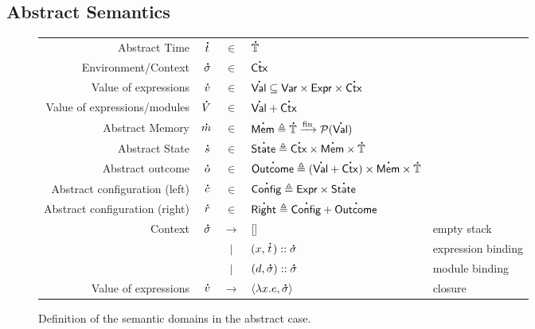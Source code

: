 \documentclass[acmsmall,screen,review]{acmart}\settopmatter{printfolios=true,printccs=false,printacmref=false}
\newcommand*{\vbar}{|}
\newcommand*{\cons}{::}
\newcommand*{\pset}{\mathcal{P}}
\newcommand*{\A}[1]{\overset{\,_{\mbox{\Large .}}}{#1}}
\newcommand*{\Expr}{\mathsf{Expr}}
\newcommand*{\ExprVar}{\mathsf{Var}}
\newcommand*{\modid}{d}
\newcommand*{\Time}{\mathbb{T}}
\newcommand*{\ctx}{\sigma}
\newcommand*{\Ctx}{\mathsf{Ctx}}
\newcommand*{\Value}{\mathsf{Val}}
\newcommand*{\Mem}{\mathsf{Mem}}
\newcommand*{\mem}{m}
\newcommand*{\Config}{\mathsf{Config}}
\newcommand*{\config}{c}
\newcommand*{\Right}{\mathsf{Right}}
\newcommand*{\rightst}{r}
\newcommand*{\State}{\mathsf{State}}
\newcommand*{\Outcome}{\mathsf{Outcome}}
\newcommand*{\fin}[2]{{#1}\xrightarrow{\text{fin}}{#2}}
\begin{document}
\subsection{Abstract Semantics}
\begin{figure}[h!]
  \footnotesize
  \centering
  \begin{tabular}{rrcll}
    Abstract Time                  & $\A{t}$        & $\in$         & $\A{\Time}$                                                                                      \\
    Environment/Context            & $\A{\ctx}$     & $\in$         & $\A{\Ctx}$                                                                                       \\
    Value of expressions           & $\A{v}$        & $\in$         & $\A{\Value} \subseteq \ExprVar\times\Expr\times\A{\Ctx}$                                         \\
    Value of expressions/modules   & $\A{V}$        & $\in$         & $\A{\Value}+\A{\Ctx}$                                                                            \\
    Abstract Memory                & $\A{\mem}$     & $\in$         & $\A{\Mem} \triangleq \fin{\A{\Time}}{\pset(\A{\Value})}$                                         \\
    Abstract State                 & $\A{s}$        & $\in$         & $\A{\State} \triangleq \A{\Ctx}\times\A{\Mem}\times\A{\Time}$                                    \\
    Abstract outcome               & $\A{o}$        & $\in$         & $\A{\Outcome} \triangleq(\A{\Value}+\A{\Ctx})\times\A{\Mem}\times\A{\Time}$                      \\
    Abstract configuration (left)  & $\A{\config}$  & $\in$         & $\A{\Config}\triangleq\Expr\times\A{\State}$                                                     \\
    Abstract configuration (right) & $\A{\rightst}$ & $\in$         & $\A{\Right}\triangleq\A{\Config}+\A{\Outcome}$                                                   \\
    Context                        & $\A{\ctx}$     & $\rightarrow$ & []                                                                          & empty stack        \\
                                   &                & $\vbar$       & $(x,\A{t})\cons \A{\ctx}$                                                   & expression binding \\
                                   &                & $\vbar$       & $(\modid,\A{\ctx})\cons \A{\ctx}$                                           & module binding     \\
    Value of expressions           & $\A{v}$        & $\rightarrow$ & $\langle \lambda x.e, \A{\ctx} \rangle$                                     & closure
  \end{tabular}
  \caption{Definition of the semantic domains in the abstract case.}
  \label{fig:absdom}
\end{figure}
\end{document}
